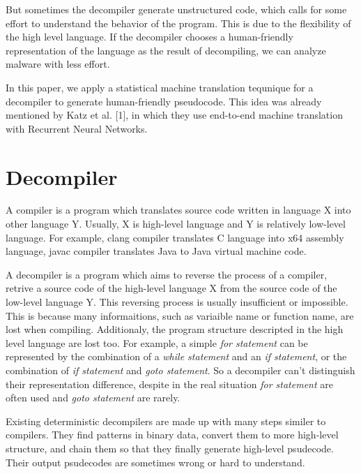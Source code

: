 \documentclass[senior,final,11pt]{iscs-thesis}
\begin{document}
But sometimes the decompiler generate  unstructured code, which calls for some effort to understand the behavior of the program. 
This is due to the flexibility of the high level language. If the decompiler chooses a human-friendly representation of the language as the result of decompiling, we can analyze malware with less effort. 

In this paper, we apply a statistical machine translation tequnique for a decompiler to generate human-friendly pseudocode. 
This idea was already mentioned by Katz et al. [1], in which they use end-to-end machine translation with Recurrent Neural Networks.


\section{Decompiler}


A compiler is a program which translates source code written in language X into other language Y. 
Usually, X is high-level language and Y is relatively low-level language. 
For example, clang compiler translates C language into x64 assembly language, javac compiler translates Java to Java virtual machine code.

A decompiler is a program which aims to reverse the process of a compiler, retrive a source code of the high-level language X from the source code of the low-level language Y. 
This reversing process is usually insufficient or impossible.
This is because many informaitions, such as variaible name or function name, are lost when compiling.
Additionaly, the program structure descripted in the high level language are lost too. 
For example, a simple {\sl for statement} can be represented by the combination of a {\sl while statement} and an {\sl if statement}, or the combination of {\sl if statement} and {\sl goto statement}. 
So a decompiler can't distinguish their representation difference, despite in the real situation {\sl for statement} are often used and {\sl goto statement} are rarely. 

Existing deterministic decompilers are made up with many steps similer to compilers. 
They find patterns in binary data, convert them to more high-level structure, and chain them so that they finally generate high-level psudecode.
Their output psudecodes are sometimes wrong or hard to understand.

\end{document}
